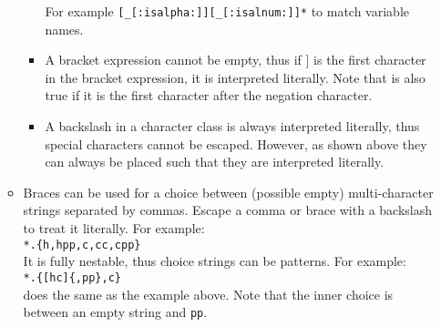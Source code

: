\begin{itemize}
\begin{itemize}
\begin{itemize}
      For example
      \texttt{[\_[:isalpha:]][\_[:isalnum:]]*} to match variable names.
    \item A bracket expression cannot be empty, thus if ] is the first
      character in the bracket expression, it is interpreted
      literally. Note that is also true if it is the first character
      after the negation character.
    \item A backslash in a character class is always interpreted
      literally, thus special characters cannot be escaped.
      However, as shown above they can always be placed such
      that they are interpreted literally.
    \end{itemize}
  \item Braces can be used for a choice between (possible empty)
    multi-character strings separated by commas.
    Escape a comma or brace with a backslash to treat it literally.
    For example:
    \\\texttt{*.\{h,hpp,c,cc,cpp\}}
    \\It is fully nestable, thus choice strings can be patterns. For example:
    \\\texttt{*.\{[hc]\{,pp\},c\}}
    \\does the same as the example above. Note that the inner choice
    is between an empty string and \texttt{pp}.
  \end{itemize}


\end{itemize}
